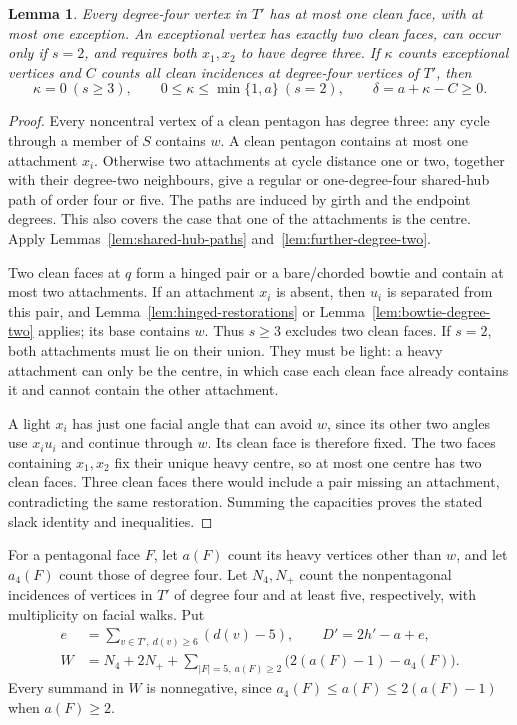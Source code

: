 \documentclass[11pt]{article}
\newtheorem{lemma}[theorem]{Lemma}
\theoremstyle{remark}
\numberwithin{equation}{section}
\numberwithin{table}{section}
\begin{document}
\begin{lemma}\label{lem:degree-two-clean-bound}
Every degree-four vertex in $T'$ has at most one clean face, with
at most one exception. An exceptional vertex has exactly two clean
faces, can occur only if $s=2$, and requires both $x_1,x_2$ to have
degree three. If $\kappa$ counts exceptional vertices and $C$ counts
all clean incidences at degree-four vertices of $T'$, then
\begin{equation}\label{eq:degree-two-clean-slack}
 \kappa=0\ (s\ge3),\qquad 0\le\kappa\le\min\{1,a\}\ (s=2),\qquad
 \delta=a+\kappa-C\ge0.
\end{equation}
\end{lemma}
\begin{proof}
Every noncentral vertex of a clean pentagon has degree three: any
cycle through a member of $S$ contains $w$. A clean pentagon contains
at most one attachment $x_i$. Otherwise two attachments at cycle
distance one or two, together with their degree-two neighbours, give
a regular or one-degree-four shared-hub path of order four or five.
The paths are induced by girth and the endpoint degrees. This also
covers the case that one of the attachments is the centre. Apply
Lemmas~\ref{lem:shared-hub-paths} and~\ref{lem:further-degree-two}.

Two clean faces at $q$ form a hinged pair or a bare/chorded bowtie
and contain at most two attachments. If an attachment $x_i$ is absent,
then $u_i$ is separated from this pair, and
Lemma~\ref{lem:hinged-restorations} or
Lemma~\ref{lem:bowtie-degree-two} applies; its base contains $w$.
Thus $s\ge3$ excludes two clean faces. If $s=2$, both attachments
must lie on their union. They must be light: a heavy attachment can
only be the centre, in which case each clean face already contains
it and cannot contain the other attachment.

A light $x_i$ has just one facial angle that can avoid $w$, since its
other two angles use $x_i u_i$ and continue through $w$. Its clean
face is therefore fixed. The two faces containing $x_1,x_2$ fix their
unique heavy centre, so at most one centre has two clean faces. Three
clean faces there would include a pair missing an attachment,
contradicting the same restoration. Summing the capacities proves
the stated slack identity and inequalities.
\end{proof}

For a pentagonal face $F$, let $a(F)$ count its heavy vertices other
than $w$, and let $a_4(F)$ count those of degree four. Let $N_4,N_+$
count the nonpentagonal incidences of vertices in $T'$ of degree four
and at least five, respectively, with multiplicity on facial walks.
Put
\begin{align}
 e&=\sum_{v\in T',\ d(v)\ge6}(d(v)-5),\qquad
 D'=2h'-a+e,\label{eq:degree-two-degree-split}\\
 W&=N_4+2N_+
   +\sum_{|F|=5,\ a(F)\ge2}\bigl(2(a(F)-1)-a_4(F)\bigr).
 \label{eq:degree-two-weighted-slack}
\end{align}
Every summand in $W$ is nonnegative, since
$a_4(F)\le a(F)\le2(a(F)-1)$ when $a(F)\ge2$.
\end{document}
